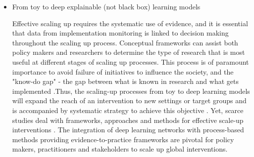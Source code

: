 \documentclass[12pt,a4paper]{article}
\begin{document}
\begin{itemize}

\itemsep{} Computation power: methods to speed up:: how does it relate to compt sustainability?
Many computational sustainability problems require making decisions through time, solving these problems involves maximizing expected reward by finding the most suitable policy \cite{mcgregor2016fast}. Yet, complex and integrative computational analysis are laborious and extremely time-consuming \cite{rodrigues2014integrative}, especially those elated to the steady-increasing amount of big data involved in deep learning approaches. Several alternatives have been recently developed such as, the development of off-policy policy evaluation using Model Free Monte Carlo (MFMC) \cite{fonteneau2010model}that can generate future hypotheses without considering the simulator to run. Other approach consists of the recently developed "stochastic computers" \cite{borders2019integer}, energetically more efficient than conventional ones, and perform faster and more complex calculations. 

\item From toy to deep explainable (not black box) learning models

Effective scaling up requires the systematic use of evidence, and it is essential that data from implementation monitoring is linked to decision making throughout the scaling up process. Conceptual frameworks can assist both policy makers and researchers to determine the type of research that is most useful at different stages of scaling up processes. This process is of paramount importance to avoid failure of initiatives to influence the society, and the "know-do gap" - the gap between what is known in research and what gets implemented \cite{catford2009advancing}.Thus, the scaling-up processes from toy to deep learning models will expand the reach of an intervention to new settings or target groups and is accompanied by systematic strategy to achieve this objective \cite{milat2014increasing}. Yet, scarce studies deal with frameworks, approaches and methods for effective scale-up interventions \cite{wigboldus2013towards, yamey2012barriers}. The integration of deep learning networks with process-based methods providing evidence-to-practice frameworks are pivotal for policy makers, practitioners and stakeholders to scale up global interventions.


\end{itemize}
\end{document}
